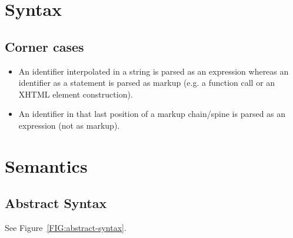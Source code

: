 \documentclass[a4paper]{article}
\begin{document}
\section{Syntax}



\subsection{Corner cases}

\begin{itemize}
\item An identifier interpolated in a string is parsed as an
  expression whereas an identifier as a statement is parsed as markup
  (e.g. a function call or an XHTML element construction).
\item An identifier in that last position of a markup chain/spine is
  parsed as an expression (not as markup). 
\end{itemize}

\section{Semantics}


\subsection{Abstract Syntax}

See Figure~\ref{FIG:abstract-syntax}.
\end{document}
